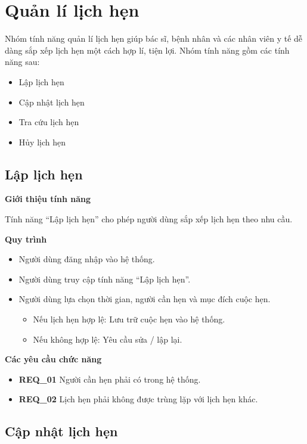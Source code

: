 \section{Quản lí lịch hẹn}

Nhóm tính năng quản lí lịch hẹn giúp bác sĩ, bệnh nhân và các nhân viên y tế dễ dàng sắp xếp lịch hẹn một cách hợp lí, tiện lợi. Nhóm tính năng gồm các tính năng sau:
\begin{itemize}
    \item Lập lịch hẹn
    \item Cập nhật lịch hẹn
    \item Tra cứu lịch hẹn
    \item Hủy lịch hẹn
\end{itemize}

\subsection{Lập lịch hẹn}

\noindent \textbf{Giới thiệu tính năng}

Tính năng ``Lập lịch hẹn'' cho phép người dùng sắp xếp lịch hẹn theo nhu cầu.

\noindent \textbf{Quy trình}
\begin{itemize}
    \item Người dùng đăng nhập vào hệ thống.
    \item Người dùng truy cập tính năng ``Lập lịch hẹn''.
    \item Người dùng lựa chọn thời gian, người cần hẹn và mục đích cuộc hẹn.
    \begin{itemize}
        \item Nếu lịch hẹn hợp lệ: Lưu trữ cuộc hẹn vào hệ thống.
        \item Nếu không hợp lệ: Yêu cầu sửa / lập lại.
    \end{itemize}
\end{itemize}

\noindent \textbf{Các yêu cầu chức năng}
\begin{itemize}
    \item \textbf{REQ\_01} Người cần hẹn phải có trong hệ thống.
    \item \textbf{REQ\_02} Lịch hẹn phải không được trùng lặp với lịch hẹn khác.
\end{itemize}

\subsection{Cập nhật lịch hẹn}

